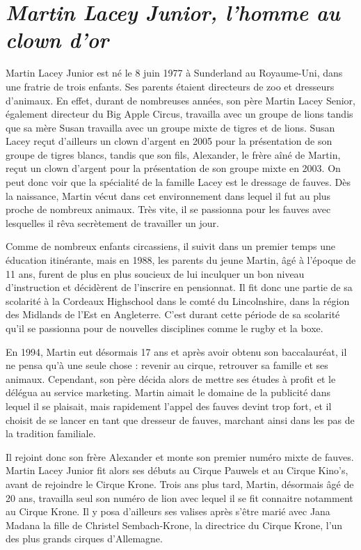 \section*{\textit{Martin Lacey Junior, l'homme au clown d'or}}
{}

Martin Lacey Junior est né le 8 juin 1977 à Sunderland au Royaume-Uni, dans une fratrie de trois enfants. Ses parents étaient directeurs de zoo et dresseurs d’animaux. En effet, durant de nombreuses années, son père Martin Lacey Senior, également directeur du Big Apple Circus, travailla avec un groupe de lions tandis que sa mère Susan travailla avec un groupe mixte de tigres et de lions. Susan Lacey reçut d'ailleurs un clown d'argent en 2005 pour la présentation de son groupe de tigres blancs, tandis que son fils, Alexander, le frère aîné de Martin, reçut un clown d'argent pour la présentation de son groupe mixte en 2003. On peut donc voir que la spécialité de la famille Lacey est le dressage de fauves. Dès la naissance, Martin vécut dans cet environnement dans lequel il fut au plus proche de nombreux animaux. Très vite, il se passionna pour les fauves avec lesquelles il rêva secrètement de travailler un jour.

Comme de nombreux enfants circassiens, il suivit dans un premier temps une éducation itinérante, mais en 1988, les parents du jeune Martin, âgé à l’époque de 11 ans, furent de plus en plus soucieux de lui inculquer un bon niveau d'instruction et décidèrent de l'inscrire en pensionnat. Il fit donc une partie de sa scolarité à la Cordeaux Highschool dans le comté du Lincolnshire, dans la région des Midlands de l'Est en Angleterre. C'est durant cette période de sa scolarité qu'il se passionna pour de nouvelles disciplines comme le rugby et la boxe.

En 1994, Martin eut désormais 17 ans et après avoir obtenu son baccalauréat, il ne pensa qu'à une seule chose : revenir au cirque, retrouver sa famille et ses animaux. Cependant, son père décida alors de mettre ses études à profit et le délégua au service marketing. Martin aimait le domaine de la publicité dans lequel il se plaisait, mais rapidement l'appel des fauves devint trop fort, et il choisit de se lancer en tant que dresseur de fauves, marchant ainsi dans les pas de la tradition familiale.

Il rejoint donc son frère Alexander et monte son premier numéro mixte de fauves. Martin Lacey Junior fit alors ses débuts au Cirque Pauwels et au Cirque Kino's, avant de rejoindre le Cirque Krone. Trois ans plus tard, Martin, désormais âgé de 20 ans, travailla seul son numéro de lion avec lequel il se fit connaitre notamment au Cirque Krone. Il y posa d’ailleurs ses valises après s'être marié avec Jana Madana la fille de Christel Sembach-Krone, la directrice du Cirque Krone, l'un des plus grands cirques d'Allemagne.

